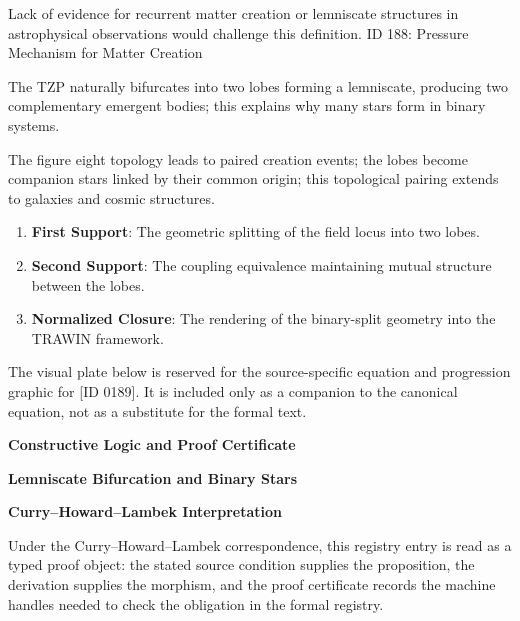 Lack of evidence for recurrent matter creation or lemniscate structures in astrophysical observations would challenge this definition. ID 188: Pressure Mechanism for Matter Creation  

The TZP naturally bifurcates into two lobes forming a lemniscate, producing two complementary emergent bodies; this explains why many stars form in binary systems.  

The figure eight topology leads to paired creation events; the lobes become companion stars linked by their common origin; this topological pairing extends to galaxies and cosmic structures.  
\endgroup

\begin{enumerate}[leftmargin=1.6em,itemsep=6pt,topsep=4pt]
\item \textbf{First Support}: The geometric splitting of the field locus into two lobes.
\item \textbf{Second Support}: The coupling equivalence maintaining mutual structure between the lobes.
\item \textbf{Normalized Closure}: The rendering of the binary-split geometry into the TRAWIN framework.
\end{enumerate}

\begingroup\footnotesize\sloppy
The visual plate below is reserved for the source-specific equation and progression graphic for [ID 0189]. It is included only as a companion to the canonical equation, not as a substitute for the formal text.
\par\endgroup
\ifTZPDarkEdition
{}
\fi

\clearpage
\begingroup\tzpsupportsetup
\noindent\textbf{\fontsize{10.8pt}{12.8pt}\selectfont [ID 0189] Constructive Logic and Proof Certificate}\par
\noindent\textbf{\fontsize{10pt}{12pt}\selectfont Lemniscate Bifurcation and Binary Stars}\par
\vspace{0.45em}
\begingroup
\footnotesize
\setlength{\parskip}{0.22em}
\setlength{\parindent}{0pt}
\noindent\textbf{Curry--Howard--Lambek Interpretation}\par
Under the Curry--Howard--Lambek correspondence, this registry entry is read as a typed proof
object: the stated source condition supplies the proposition, the derivation supplies the
morphism, and the proof certificate records the machine handles needed to check the obligation
in the formal registry.

